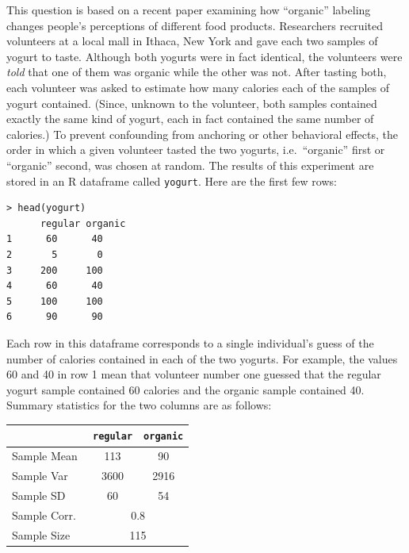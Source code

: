 \documentclass[addpoints,12pt]{exam}\usepackage[]{graphicx}\usepackage[]{xcolor}
\begin{document}
\begin{questions}

\question This question is based on a recent paper examining how ``organic'' labeling changes people's perceptions of different food products. Researchers recruited volunteers at a local mall in Ithaca, New York and gave each two samples of yogurt to taste. Although both yogurts were in fact identical, the volunteers were \emph{told} that one of them was organic while the other was not. After tasting both, each volunteer was asked to estimate how many calories each of the samples of yogurt contained. (Since, unknown to the volunteer, both samples contained exactly the same kind of yogurt, each in fact contained the same number of calories.) To prevent confounding from anchoring or other behavioral effects, the order in which a given volunteer tasted the two yogurts, i.e.\ ``organic'' first or ``organic'' second, was chosen at random. The results of this experiment are stored in an R dataframe called \texttt{yogurt}. Here are the first few rows:
	\begin{verbatim}
> head(yogurt)
	  regular organic
1      60      40
2       5       0
3     200     100
4      60      40
5     100     100
6      90      90
	\end{verbatim}
Each row in this dataframe corresponds to a single individual's guess of the number of calories contained in each of the two yogurts. For example, the values 60 and 40 in row 1 mean that volunteer number one guessed that the regular yogurt sample contained 60 calories and the organic sample contained 40. Summary statistics for the two columns are as follows:
	\begin{center}
		\begin{tabular}{|lcc|}
		\hline
			& \texttt{regular} & \texttt{organic}\\
			\hline
		Sample Mean & 113 & 90\\
		Sample Var & 3600 & 2916\\
		Sample SD & 60 & 54\\ 
		Sample Corr.\ &\multicolumn{2}{c|}{0.8} \\
		Sample Size &\multicolumn{2}{c|}{115} \\
		\hline
		\end{tabular}
	\end{center}
	\vspace{1em}
	\begin{parts}

\end{parts}
\end{questions}
\end{document}
